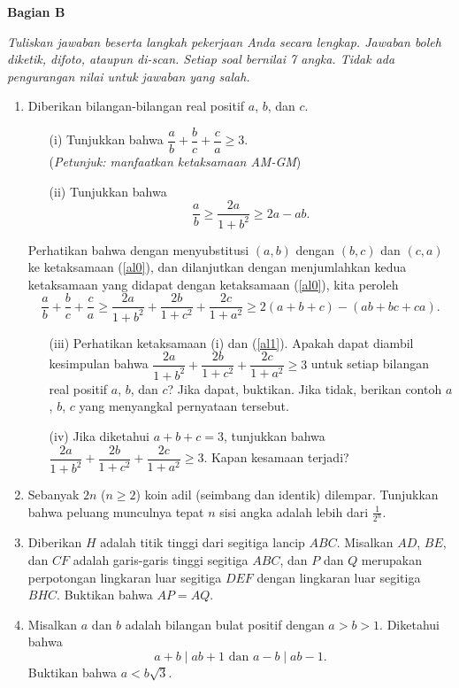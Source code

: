 \documentclass[bahasa, a4paper,12pt]{article}
\begin{document}
\newpage

\begin{center}
\textbf{Bagian B}
\end{center}
{\it Tuliskan jawaban beserta langkah pekerjaan Anda secara lengkap. Jawaban boleh diketik, difoto, ataupun di-scan. Setiap soal bernilai 7 angka. Tidak ada pengurangan nilai untuk jawaban yang salah.}
\begin{enumerate}
\item Diberikan bilangan-bilangan real positif $a$, $b$, dan $c$.
\begin{enumerate}
	\item[(i)] Tunjukkan bahwa $\dfrac{a}{b}+\dfrac{b}{c}+\dfrac{c}{a}\geq 3$. \\
	(\textit{Petunjuk: manfaatkan ketaksamaan AM-GM})
	\item[(ii)] Tunjukkan bahwa
	\begin{equation}\label{al0}
	\frac{a}{b}\geq \frac{2a}{1+b^2}\geq 2a-ab.\tag{*}
	\end{equation}
\end{enumerate}
	Perhatikan bahwa dengan menyubstitusi $(a,b)$ dengan $(b,c)$ dan $(c,a)$ ke  ketaksamaan (\ref{al0}), dan dilanjutkan dengan menjumlahkan kedua ketaksamaan yang didapat dengan ketaksamaan (\ref{al0}), kita peroleh
	\begin{equation*}\label{al1}
	\frac{a}{b}+\frac{b}{c}+\frac{c}{a} \geq \frac{2a}{1+b^2}+\frac{2b}{1+c^2}+\frac{2c}{1+a^2}\geq 2(a+b+c)-(ab+bc+ca).\tag{**}
	\end{equation*}
	\begin{enumerate}
	\item[(iii)] Perhatikan ketaksamaan (i) dan (\ref{al1}). Apakah dapat diambil kesimpulan bahwa $\dfrac{2a}{1+b^2}+\dfrac{2b}{1+c^2}+\dfrac{2c}{1+a^2}\geq 3$ untuk setiap bilangan real positif $a$, $b$, dan $c$? Jika dapat, buktikan. Jika tidak, berikan contoh $a$, $b$, $c$ yang menyangkal pernyataan tersebut.
	\item[(iv)] Jika diketahui $a+b+c=3$, tunjukkan bahwa $\dfrac{2a}{1+b^2}+\dfrac{2b}{1+c^2}+\dfrac{2c}{1+a^2}\geq 3$. Kapan kesamaan terjadi?
\end{enumerate}

\item Sebanyak $2n$ ($n \geq 2$) koin adil (seimbang dan identik) dilempar. Tunjukkan bahwa peluang munculnya tepat $n$ sisi angka adalah lebih dari $\frac{1}{2^n}$.

\item Diberikan $H$ adalah titik tinggi dari segitiga lancip $ABC$. Misalkan $AD$, $BE$, dan $CF$ adalah garis-garis tinggi segitiga $ABC$, dan $P$ dan $Q$ merupakan perpotongan lingkaran luar segitiga $DEF$ dengan lingkaran luar segitiga $BHC$. Buktikan bahwa $AP = AQ$.

\item Misalkan $a$ dan $b$ adalah bilangan bulat positif dengan $a > b > 1$. Diketahui bahwa \[ a+b\mid ab+1 \text{ dan } a-b\mid ab-1. \] Buktikan bahwa $a < b\sqrt{3}$.

\end{enumerate}
\end{document}
